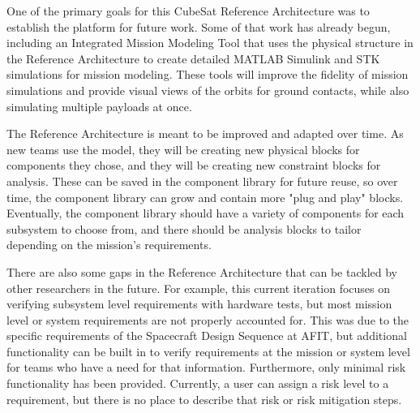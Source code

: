 
One of the primary goals for this CubeSat Reference Architecture was to establish the platform for future work. Some of that work has already begun, including an Integrated Mission Modeling Tool that uses the physical structure in the Reference Architecture to create detailed MATLAB Simulink and STK simulations for mission modeling. These tools will improve the fidelity of mission simulations and provide visual views of the orbits for ground contacts, while also simulating multiple payloads at once.

The Reference Architecture is meant to be improved and adapted over time. As new teams use the model, they will be creating new physical blocks for components they chose, and they will be creating new constraint blocks for analysis. These can be saved in the component library for future reuse, so over time, the component library can grow and contain more "plug and play" blocks. Eventually, the component library should have a variety of components for each subsystem to choose from, and there should be analysis blocks to tailor depending on the mission's requirements. 

There are also some gaps in the Reference Architecture that can be tackled by other researchers in the future. For example, this current iteration focuses on verifying subsystem level requirements with hardware tests, but most mission level or system requirements are not properly accounted for. This was due to the specific requirements of the Spacecraft Design Sequence at AFIT, but additional functionality can be built in to verify requirements at the mission or system level for teams who have a need for that information. Furthermore, only minimal risk functionality has been provided. Currently, a user can assign a risk level to a requirement, but there is no place to describe that risk or risk mitigation steps. 
